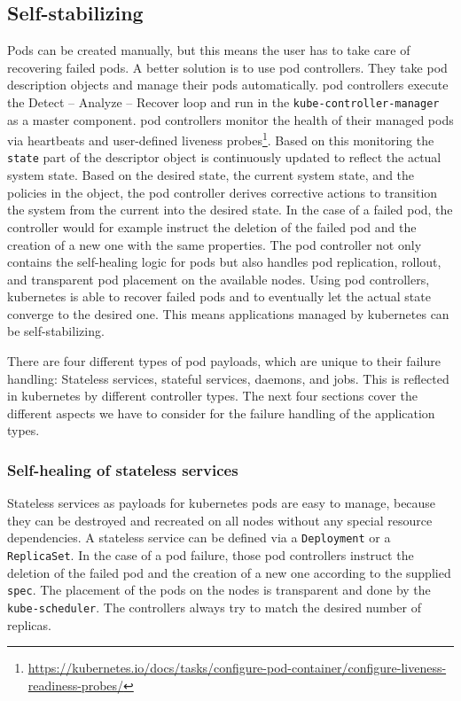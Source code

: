 \subsection{Self-stabilizing}\label{sec:self-healing-kubernetes:self-stabilizing}
  Pods can be created manually, but this means the user has to take care of recovering failed pods.
  A better solution is to use \glspl{pod controller}.
  They take pod description objects and manage their pods automatically.
  \Glspl{pod controller} execute the Detect -- Analyze -- Recover loop and run in the \texttt{kube-controller-manager} as a master component.
  \Glspl{pod controller} monitor the health of their managed pods via heartbeats and user-defined liveness probes\footnote{\url{https://kubernetes.io/docs/tasks/configure-pod-container/configure-liveness-readiness-probes/}}.
  Based on this monitoring the \texttt{state} part of the descriptor object is continuously updated to reflect the actual system state.
  Based on the desired state, the current system state, and the policies in the object, the \gls{pod controller} derives corrective actions to transition the system from the current into the desired state.
  In the case of a failed pod, the controller would for example instruct the deletion of the failed pod and the creation of a new one with the same properties.
  The \gls{pod controller} not only contains the self-healing logic for pods but also handles pod replication, rollout, and transparent pod placement on the available nodes.
  Using \glspl{pod controller}, \gls{kubernetes} is able to recover failed pods and to eventually let the actual state converge to the desired one.
  This means applications managed by \gls{kubernetes} can be self-stabilizing.

  There are four different types of pod payloads, which are unique to their failure handling:
  Stateless services, stateful services, daemons, and jobs.
  This is reflected in \gls{kubernetes} by different controller types.
  The next four sections cover the different aspects we have to consider for the failure handling of the application types.

  \subsubsection{Self-healing of stateless services}
    Stateless services as payloads for \gls{kubernetes} pods are easy to manage, because they can be destroyed and recreated on all nodes without any special resource dependencies.
    A stateless service can be defined via a \texttt{Deployment} or a \texttt{ReplicaSet}.
    In the case of a pod failure, those \glspl{pod controller} instruct the deletion of the failed pod and the creation of a new one according to the supplied \texttt{spec}.
    The placement of the pods on the nodes is transparent and done by the \texttt{kube-scheduler}.
    The controllers always try to match the desired number of replicas.

